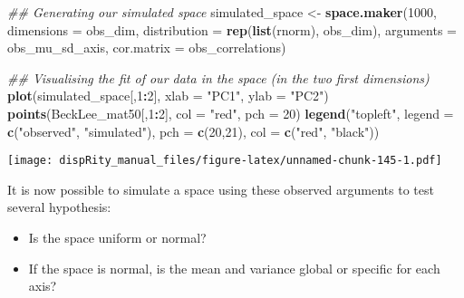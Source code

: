 \documentclass[
]{book}
\newenvironment{Shaded}{\begin{snugshade}}{\end{snugshade}}
\newcommand{\CommentTok}[1]{\textcolor[rgb]{0.56,0.35,0.01}{\textit{#1}}}
\newcommand{\DataTypeTok}[1]{\textcolor[rgb]{0.13,0.29,0.53}{#1}}
\newcommand{\DecValTok}[1]{\textcolor[rgb]{0.00,0.00,0.81}{#1}}
\newcommand{\KeywordTok}[1]{\textcolor[rgb]{0.13,0.29,0.53}{\textbf{#1}}}
\newcommand{\NormalTok}[1]{#1}
\newcommand{\OperatorTok}[1]{\textcolor[rgb]{0.81,0.36,0.00}{\textbf{#1}}}
\newcommand{\StringTok}[1]{\textcolor[rgb]{0.31,0.60,0.02}{#1}}
\providecommand{\tightlist}{%
  \setlength{\itemsep}{0pt}\setlength{\parskip}{0pt}}
\begin{document}
\begin{Shaded}
\begin{Highlighting}[]
\CommentTok{\#\# Generating our simulated space}
\NormalTok{simulated\_space \textless{}{-}}\StringTok{ }\KeywordTok{space.maker}\NormalTok{(}\DecValTok{1000}\NormalTok{, }\DataTypeTok{dimensions =}\NormalTok{ obs\_dim, }
                               \DataTypeTok{distribution =} \KeywordTok{rep}\NormalTok{(}\KeywordTok{list}\NormalTok{(rnorm), obs\_dim),}
                               \DataTypeTok{arguments =}\NormalTok{ obs\_mu\_sd\_axis,}
                               \DataTypeTok{cor.matrix =}\NormalTok{ obs\_correlations)}

\CommentTok{\#\# Visualising the fit of our data in the space (in the two first dimensions)}
\KeywordTok{plot}\NormalTok{(simulated\_space[,}\DecValTok{1}\OperatorTok{:}\DecValTok{2}\NormalTok{], }\DataTypeTok{xlab =} \StringTok{"PC1"}\NormalTok{, }\DataTypeTok{ylab =} \StringTok{"PC2"}\NormalTok{)}
\KeywordTok{points}\NormalTok{(BeckLee\_mat50[,}\DecValTok{1}\OperatorTok{:}\DecValTok{2}\NormalTok{], }\DataTypeTok{col =} \StringTok{"red"}\NormalTok{, }\DataTypeTok{pch =} \DecValTok{20}\NormalTok{)}
\KeywordTok{legend}\NormalTok{(}\StringTok{"topleft"}\NormalTok{, }\DataTypeTok{legend =} \KeywordTok{c}\NormalTok{(}\StringTok{"observed"}\NormalTok{, }\StringTok{"simulated"}\NormalTok{),}
        \DataTypeTok{pch =} \KeywordTok{c}\NormalTok{(}\DecValTok{20}\NormalTok{,}\DecValTok{21}\NormalTok{), }\DataTypeTok{col =} \KeywordTok{c}\NormalTok{(}\StringTok{"red"}\NormalTok{, }\StringTok{"black"}\NormalTok{))}
\end{Highlighting}
\end{Shaded}

\texttt{[image: dispRity\_manual\_files/figure-latex/unnamed-chunk-145-1.pdf]}

It is now possible to simulate a space using these observed arguments to test several hypothesis:

\begin{itemize}
\tightlist
\item
  Is the space uniform or normal?
\item
  If the space is normal, is the mean and variance global or specific for each axis?
\end{itemize}
\end{document}
